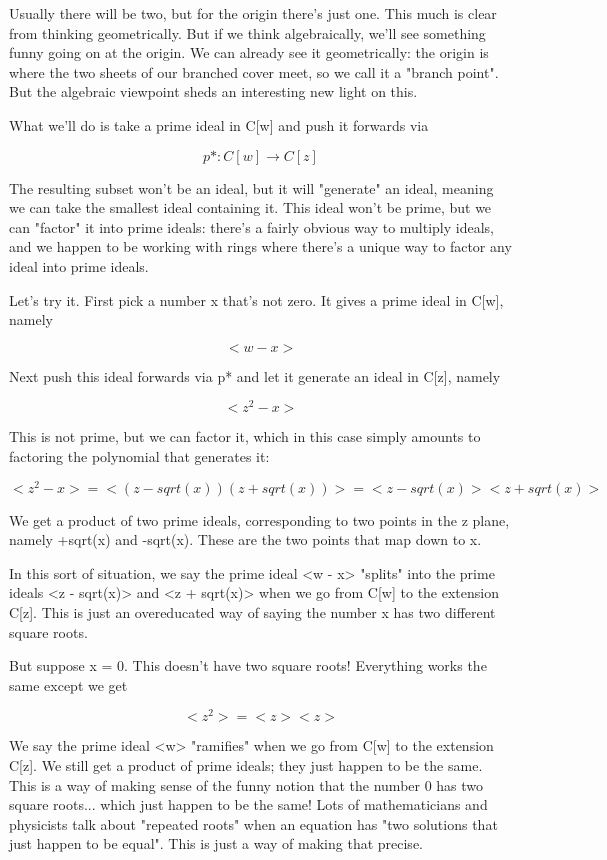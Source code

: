 Usually there will be two, but for the origin there's just one.  This 
much is clear from thinking geometrically.  But if we think algebraically, 
we'll see something funny going on at the origin.   We can already see 
it geometrically: the origin is where the two sheets of our branched 
cover meet, so we call it a "branch point".  But the algebraic 
viewpoint sheds an interesting new light on this.  

What we'll do is take a prime ideal in C[w] and push it forwards via

$$
p*: C[w] \to  C[z]
$$
    
The resulting subset won't be an ideal, but it will "generate" an 
ideal, meaning we can take the smallest ideal containing it.  This
ideal won't be prime, but we can "factor" it into prime 
ideals: there's
a fairly obvious way to multiply ideals, and we happen to be working
with rings where there's a unique way to factor any ideal into prime
ideals.

Let's try it.  First pick a number x that's not zero.  It gives a prime 
ideal in C[w], namely 

$$
<w - x>
$$
    
Next push this ideal forwards via p* and let it generate an
ideal in C[z], namely

$$
<z^{2} - x>
$$
    
This is not prime, but we can factor it, which in this case simply 
amounts to factoring the polynomial that generates it:

$$
<z^{2} - x> = <(z - sqrt(x)) (z + sqrt(x))> 

         =  <z - sqrt(x)> <z + sqrt(x)>
$$
    
We get a product of two prime ideals, corresponding to two points in 
the z plane, namely +sqrt(x) and -sqrt(x).  These are the two points
that map down to x.

In this sort of situation, we say the prime ideal <w - x> 
"splits"
into the prime ideals <z - sqrt(x)> and <z + sqrt(x)> when 
we go from
C[w] to the extension C[z].  This is just an overeducated way of saying
the number x has two different square roots.

But suppose x = 0.  This doesn't have two square roots!  Everything
works the same except we get

$$
<z^{2}> = <z> <z>
$$
    
We say the prime ideal <w> "ramifies" when we go 
from C[w] to the 
extension C[z].  We still get a product of prime ideals; they just happen 
to be the same.  This is a way of making sense of the funny notion that 
the number 0 has two square roots... which just happen to be the same!  
Lots of mathematicians and physicists talk about "repeated roots"
when 
an equation has "two solutions that just happen to be equal".  
This is just a way of making that precise.


